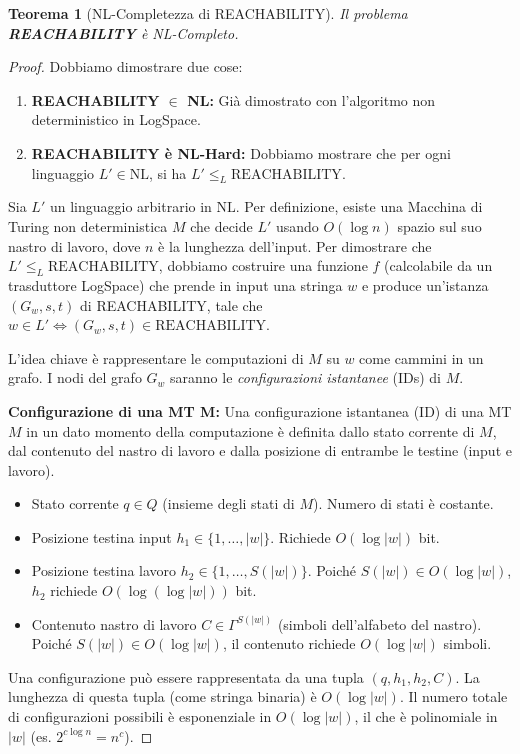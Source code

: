 \documentclass[a4paper]{article}
\newtheorem{theorem}{Teorema}[section]
\begin{document}
\begin{theorem}[NL-Completezza di REACHABILITY]
Il problema \textbf{REACHABILITY} è NL-Completo.
\end{theorem}
\begin{proof}
Dobbiamo dimostrare due cose:
\begin{enumerate}
    \item \textbf{REACHABILITY $\in$ NL:} Già dimostrato con l'algoritmo non deterministico in LogSpace.
    \item \textbf{REACHABILITY è NL-Hard:} Dobbiamo mostrare che per ogni linguaggio $L' \in \text{NL}$, si ha $L' \le_L \text{REACHABILITY}$.
\end{enumerate}

Sia $L'$ un linguaggio arbitrario in $\text{NL}$. Per definizione, esiste una Macchina di Turing non deterministica $M$ che decide $L'$ usando $O(\log n)$ spazio sul suo nastro di lavoro, dove $n$ è la lunghezza dell'input.
Per dimostrare che $L' \le_L \text{REACHABILITY}$, dobbiamo costruire una funzione $f$ (calcolabile da un trasduttore LogSpace) che prende in input una stringa $w$ e produce un'istanza $(G_w, s, t)$ di REACHABILITY, tale che $w \in L' \iff (G_w, s, t) \in \text{REACHABILITY}$.

L'idea chiave è rappresentare le computazioni di $M$ su $w$ come cammini in un grafo. I nodi del grafo $G_w$ saranno le \emph{configurazioni istantanee} (IDs) di $M$.

\textbf{Configurazione di una MT M:} Una configurazione istantanea (ID) di una MT $M$ in un dato momento della computazione è definita dallo stato corrente di $M$, dal contenuto del nastro di lavoro e dalla posizione di entrambe le testine (input e lavoro).
\begin{itemize}
    \item Stato corrente $q \in Q$ (insieme degli stati di $M$). Numero di stati è costante.
    \item Posizione testina input $h_1 \in \{1, \dots, |w|\}$. Richiede $O(\log |w|)$ bit.
    \item Posizione testina lavoro $h_2 \in \{1, \dots, S(|w|)\}$. Poiché $S(|w|) \in O(\log |w|)$, $h_2$ richiede $O(\log(\log |w|))$ bit.
    \item Contenuto nastro di lavoro $C \in \Gamma^{S(|w|)}$ (simboli dell'alfabeto del nastro). Poiché $S(|w|) \in O(\log |w|)$, il contenuto richiede $O(\log |w|)$ simboli.
\end{itemize}
Una configurazione può essere rappresentata da una tupla $(q, h_1, h_2, C)$. La lunghezza di questa tupla (come stringa binaria) è $O(\log |w|)$.
Il numero totale di configurazioni possibili è esponenziale in $O(\log |w|)$, il che è polinomiale in $|w|$ (es. $2^{c \log n} = n^c$).


\end{proof}
\end{document}
